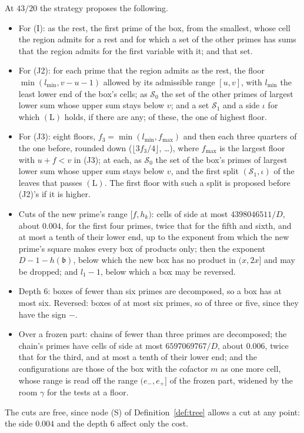 \documentclass[11pt]{article}
\theoremstyle{definition}
\begin{document}
At $43/20$ the strategy proposes the following.
\begin{itemize}
\item For (I): as the rest, the first prime of the box, from the smallest, whose cell the region admits for a rest and
  for which a set of the other primes has sums that the region admits for the first variable with it; and that set.
\item For (J2): for each prime that the region admits as the rest, the floor $\min(l_{\min}, v - u - 1)$ allowed by its
  admissible range $[u, v]$, with $l_{\min}$ the least lower end of the box's cells; as $\mathcal S_0$ the set of the
  other primes
  of largest lower sum whose upper sum stays below $v$; and a set $\mathcal S_1$ and a side $\iota$ for which
  $(\mathrm L)$ holds, if there are any; of these, the one of highest floor.
\item For (J3): eight floors, $f_3 = \min(l_{\min}, f_{\max})$ and then each three quarters of the one before, rounded
  down ($\lfloor 3f_3/4 \rfloor$, \dots), where $f_{\max}$ is the largest floor with $u + f < v$ in (J3); at each, as
  $\mathcal S_0$ the set of the box's primes of largest lower sum whose upper sum stays below $v$, and the first split
  $(\mathcal S_1, \iota)$ of the leaves that passes $(\mathrm L)$. The first floor with such a split is proposed before
  (J2)'s if it is higher.
\item Cuts of the new prime's range $[f, h_k)$: cells of side at most $4398046511/D$, about $0.004$, for the first four
  primes, twice that for the fifth and sixth, and at most a tenth of their lower end, up to the exponent from which the
  new prime's square makes every box of products only; then the exponent $D - 1 - h(\mathfrak b)$, below which the new
  box has no product in $(x, 2x]$ and may be dropped; and $l_1 - 1$, below which a box may be reversed.
\item Depth $6$: boxes of fewer than six primes are decomposed, so a box has at most six. Reversed: boxes of at most six
  primes, so of three or five, since they have the sign $-$.
\item Over a frozen part: chains of fewer than three primes are decomposed; the chain's primes have cells of side at
  most $6597069767/D$, about $0.006$, twice that for the third, and at most a tenth of their lower end; and the
  configurations are those of the box with the cofactor $m$ as one more cell, whose range is read off the range
  $(e_-, e_+]$ of the frozen part, widened by the room $\gamma$ for the tests at a floor.
\end{itemize}
The cuts are free, since node (S) of Definition~\ref{def:tree} allows a cut at any point: the side $0.004$ and the
depth $6$ affect only the cost.
\end{document}
